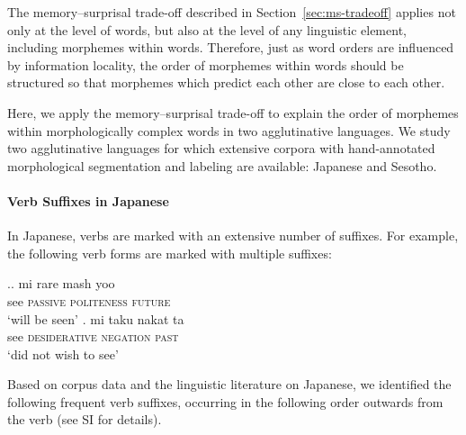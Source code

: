 
The memory--surprisal trade-off described in Section~\ref{sec:ms-tradeoff} applies not only at the level of words, but also at the level of any linguistic element, including morphemes within words. Therefore, just as word orders are influenced by information locality, the order of morphemes within words should be structured so that morphemes which predict each other are close to each other.

Here, we apply the memory--surprisal trade-off to explain the order of morphemes within morphologically complex words in two agglutinative languages. We study two agglutinative languages for which extensive corpora with hand-annotated morphological segmentation and labeling are available: Japanese and Sesotho.


\paragraph{Verb Suffixes in Japanese}

In Japanese, verbs are marked with an extensive number of suffixes. For example, the following verb forms are marked with multiple suffixes:

\ex.\ag. mi  rare mash yoo \\
see  \textsc{passive}  \textsc{politeness}  \textsc{future} \\
`will be seen'
\bg. mi taku nakat ta \\
see \textsc{desiderative} \textsc{negation} \textsc{past} \\
`did not wish to see'

Based on corpus data and the linguistic literature on Japanese, we identified the following frequent verb suffixes, occurring in the following order outwards from the verb (see SI for details).


